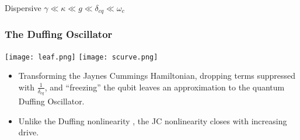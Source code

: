 \documentclass{beamer}
\begin{document}


\begin{frame}

    \begin{block}{Dispersive}
        $\gamma \ll \kappa \ll g \ll \delta_{cq} \ll \omega_c$
    \end{block}

\end{frame}
\begin{frame}

    \frametitle{The Duffing Oscillator}

    \texttt{[image: leaf.png]}
    \texttt{[image: scurve.png]}

    \begin{itemize}
        \item Transforming the Jaynes Cummings Hamiltonian, dropping terms suppressed with $\frac{1}{\delta_{cq}}$, and ``freezing'' the qubit leaves an approximation to the quantum Duffing Oscillator.
        \item Unlike the Duffing nonlinearity , the JC nonlinearity closes with increasing drive.
    \end{itemize}

\end{frame}



\printbibliography\
\end{document}
